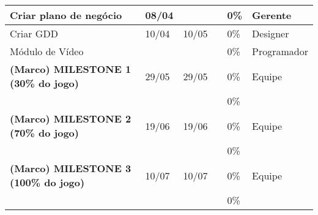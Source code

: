 \documentclass[a4paper, 11pt]{article} %
\begin{document}
\begin{table}[h]
\begin{tabular}{|l|l|l|l|l|l|}
Criar plano de negócio                       & 08/04           &              &                    & 0\%                & Gerente              \\ \hline
Criar GDD                                    & 10/04           & 10/05        &                    & 0\%                & Designer             \\ \hline
Módulo de Vídeo                     			&                 &              &                    & 0\%                & Programador          \\ \hline
\textbf{(Marco) MILESTONE 1 (30\% do jogo)}  & 29/05           & 29/05        &                    & 0\%                & Equipe		           \\ \hline
									        &          		  &         		&                    & 0\%                & 	     	           \\ \hline
\textbf{(Marco) MILESTONE 2 (70\% do jogo)}  & 19/06           & 19/06        &                    & 0\%                & Equipe		           \\ \hline
									        &          		  &         		&                    & 0\%                & 	     	           \\ \hline
\textbf{(Marco) MILESTONE 3 (100\% do jogo)} & 10/07           & 10/07        &                    & 0\%                & Equipe		           \\ \hline
									        &          		  &         		&                    & 0\%                & 	     	           \\ \hline
\end{tabular}
\end{table}
\end{document}
